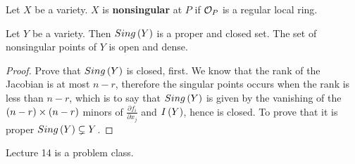 \begin{definition}
Let $ X $ be a variety. $ X $ is \textbf{nonsingular} at $ P $ if $ \mathcal{O}_P $ is a regular local ring.
\end{definition}

\begin{theorem}
Let $ Y $ be a variety. Then $ Sing\left( Y \right) $ is a proper and closed set. The set of nonsingular points of $ Y $ is open and dense.
\end{theorem}

\begin{proof}
Prove that $ Sing\left( Y \right) $ is closed, first. We know that the rank of the Jacobian is at most $ n - r $, therefore the singular points occurs when the rank is less than $ n - r $, which is to say that $ Sing\left( Y \right) $ is given by the vanishing of the $ \left( n - r \right) \times \left( n - r \right) $ minors of $ \tfrac{\partial f_i}{\partial x_j} $ and $ I\left( Y \right) $, hence is closed. To prove that it is proper $ Sing\left( Y \right) \subsetneq Y $.
\end{proof}


Lecture 14 is a problem class.

